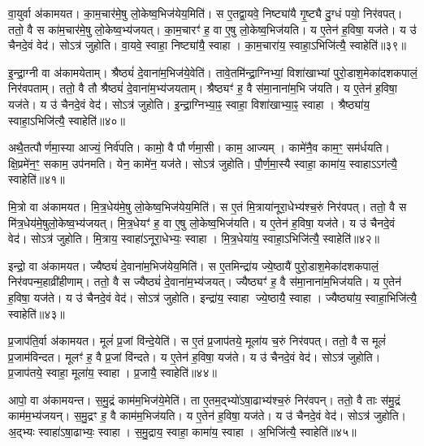 वा॒युर्वा अ॑कामयत।
का॒म॒चार॑मे॒षु लो॒केष्व॒भिज॑येय॒मिति॑।
स ए॒तद्वा॒यवे॒ निष्ट्या॑यै गृ॒ष्ट्यै दु॒ग्धं पयो॒ निर॑वपत्।
ततो॒ वै स का॑म॒चार॑मे॒षु लो॒केष्व॒भ्य॑जयत्।
का॒म॒चारꣳ॑ ह॒ वा ए॒षु लो॒केष्व॒भिज॑यति।
य ए॒तेन॑ ह॒विषा॒ यज॑ते।
य उ॑ चैनदे॒वं वेद॑।
सोऽत्र॑ जुहोति।
वा॒यवे॒ स्वाहा॒ निष्ट्या॑यै॒ स्वाहा।
का॒म॒चारा॑य॒ स्वाहा॒\-ऽभिजि॑त्यै॒ स्वाहेति॑॥३९॥

इ॒न्द्रा॒ग्नी वा अ॑कामयेताम्।
श्रैष्ठ्यं॑ दे॒वाना॑म॒भिज॑ये॒वेति॑।
तावे॒तमि॑न्द्रा॒ग्निभ्यां॒ विशा॑खाभ्यां पुरो॒डाश॒मेका॑दशकपालं॒ निर॑वपताम्।
ततो॒ वै तौ श्रैष्ठ्यं॑ दे॒वाना॑म॒भ्य॑जयताम्।
श्रैष्ठ्यꣳ॑ ह॒ वै स॑मा॒नाना॑म॒भि ज॑यति।
य ए॒तेन॑ ह॒विषा॒ यज॑ते।
य उ॑ चैनदे॒वं वेद॑।
सोऽत्र॑ जुहोति।
इ॒न्द्रा॒ग्निभ्या॒ꣴ॒ स्वाहा॒ विशा॑खाभ्या॒ꣴ॒ स्वाहा।
श्रैष्ठ्या॑य॒ स्वाहा॒\-ऽभिजि॑त्यै॒ स्वाहेति॑॥४०॥

अथै॒तत्पौर्णमा॒स्या आज्यं॒ निर्व॑पति।
कामो॒ वै पौर्णमा॒सी।
काम॒ आज्यम्।
कामे॑नै॒व काम॒ꣳ॒ सम॑र्धयति।
क्षि॒प्रमे॑न॒ꣳ॒ सकाम॒ उप॑नमति।
येन॒ कामे॑न॒ यज॑ते।
सोऽत्र॑ जुहोति।
पौ॒र्ण॒मा॒स्यै स्वाहा॒ कामा॑य॒ स्वाहा\-ऽऽग॑त्यै॒ स्वाहेति॑॥४१॥\anuvakamend[अ॒ग्निः पञ्च॑दश प्र॒जाप॑तिः॒ षोड॑श॒ सोम॒ एका॑दश रु॒द्रो दश॒र्क्षैका॑दश॒ बृह॒स्पति॒र्दश॑ देवासु॒रा नव॑ पि॒तर॒ एका॑दशार्य॒मा भगो॒ दश॑ दश सवि॒ता चतु॑र्दश॒ त्वष्टा॑ वा॒युरि॑न्द्रा॒ग्नी दश॑ द॒शाथै॒तत्पौर्णमा॒स्या अ॒ष्टौ पञ्च॑दश]

मि॒त्रो वा अ॑कामयत।
मि॒त्र॒धेय॑मे॒षु लो॒केष्व॒भिज॑येय॒मिति॑।
स ए॒तं मि॒त्राया॑नूरा॒धेभ्य॑श्च॒रुं निर॑वपत्।
ततो॒ वै स मि॑त्र॒धेय॑मे॒षुलो॒केष्व॒भ्य॑जयत्।
मि॒त्र॒धेयꣳ॑ ह॒ वा ए॒षु लो॒केष्व॒भिज॑यति।
य ए॒तेन॑ ह॒विषा॒ यज॑ते।
य उ॑ चैनदे॒वं वेद॑।
सोऽत्र॑ जुहोति।
मि॒त्राय॒ स्वाहा॑\-ऽनूरा॒धेभ्यः॒ स्वाहा।
मि॒त्र॒धेया॑य॒ स्वाहा॒\-ऽभिजि॑त्यै॒ स्वाहेति॑॥४२॥

इन्द्रो॒ वा अ॑कामयत।
ज्यैष्ठ्यं॑ दे॒वाना॑म॒भिज॑येय॒मिति॑।
स ए॒तमिन्द्रा॑य ज्ये॒ष्ठायै॑ पुरो॒डाश॒मेका॑दशकपालं॒ निर॑वपन्म॒हाव्री॑हीणाम्।
ततो॒ वै स ज्यैष्ठ्यं॑ दे॒वाना॑म॒भ्य॑जयत्।
ज्यैष्ठ्यꣳ॑ ह॒ वै स॑मा॒नाना॑म॒भिज॑यति।
य ए॒तेन॑ ह॒विषा॒ यज॑ते।
य उ॑ चैनदे॒वं वेद॑।
सोऽत्र॑ जुहोति।
इन्द्रा॑य॒ स्वाहा ज्ये॒ष्ठायै॒ स्वाहा।
ज्यैष्ठ्या॑य॒ स्वाहा॒भिजि॑त्यै॒ स्वाहेति॑॥४३॥

प्र॒जाप॑ति॒र्वा अ॑कामयत।
मूलं॑ प्र॒जां वि॑न्दे॒येति॑।
स ए॒तं प्र॒जाप॑तये॒ मूला॑य च॒रुं निर॑वपत्।
ततो॒ वै स मूलं॑ प्र॒जाम॑विन्दत।
मूलꣳ॑ ह॒ वै प्र॒जां वि॑न्दते।
य ए॒तेन॑ ह॒विषा॒ यज॑ते।
य उ॑ चैनदे॒वं वेद॑।
सोऽत्र॑ जुहोति।
प्र॒जाप॑तये॒ स्वाहा॒ मूला॑य॒ स्वाहा।
प्र॒जायै॒ स्वाहेति॑॥४४॥

आपो॒ वा अ॑कामयन्त।
स॒मु॒द्रं काम॑म॒भिज॑ये॒मेति॑।
ता ए॒तम॒द्भ्यो॑\-ऽषा॒ढाभ्य॑श्च॒रुं निर॑वपन्।
ततो॒ वै ताः स॑मु॒द्रं काम॑म॒भ्य॑जयन्।
स॒मु॒द्रꣳ ह॒ वै काम॑म॒भिज॑यति।
य ए॒तेन॑ ह॒विषा॒ यज॑ते।
य उ॑ चैनदे॒वं वेद॑।
सोऽत्र॑ जुहोति।
अ॒द्भ्यः स्वाहा॑\-ऽषा॒ढाभ्यः॒ स्वाहा।
स॒मु॒द्राय॒ स्वाहा॒ कामा॑य॒ स्वाहा।
अ॒भिजि॑त्यै॒ स्वाहेति॑॥४५॥

